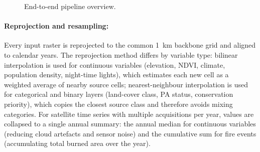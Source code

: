 \documentclass[12pt]{article}
\theoremstyle{break}
\begin{document}
\begin{figure}[H]
{
}
\vspace{3pt}
\caption{End-to-end pipeline overview.}
\label{fig:pipeline}
\end{figure}

\label{sec:preprocessing}
\paragraph{Reprojection and resampling:}
Every input raster is reprojected to the common 1~km backbone grid and aligned to
calendar years. The reprojection method differs by variable type: bilinear
interpolation is used for continuous variables (elevation, NDVI, climate, population
density, night-time lights), which estimates each new cell as a weighted average of
nearby source cells; nearest-neighbour interpolation is used for categorical and
binary layers (land-cover class, PA status, conservation priority), which copies the
closest source class and therefore avoids mixing categories. For satellite time series with multiple
acquisitions per year, values are collapsed to a single annual summary: the annual
median for continuous variables (reducing cloud artefacts and sensor noise) and the
cumulative sum for fire events (accumulating total burned area over the year).
\end{document}
